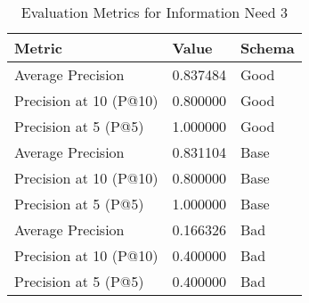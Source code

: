 \begingroup
    \renewcommand{\arraystretch}{2} %
    \begin{table}[!h]
        \centering
        \begin{tabular}{l | l | l}
            Metric & Value & Schema \\
            \hline
            Average Precision & 0.837484 & Good \\
            Precision at 10 (P@10) & 0.800000 & Good\\
            Precision at 5 (P@5) & 1.000000 & Good\\
            \hline
            Average Precision & 0.831104 & Base \\
            Precision at 10 (P@10) & 0.800000 & Base\\
            Precision at 5 (P@5) & 1.000000 & Base\\
            \hline
            Average Precision & 0.166326 & Bad\\
            Precision at 10 (P@10) & 0.400000 & Bad\\
            Precision at 5 (P@5) & 0.400000 & Bad\\
        \end{tabular}
        \caption{Evaluation Metrics for Information Need 3}
        \label{tab:metrics-info-3}
    \end{table}
\endgroup